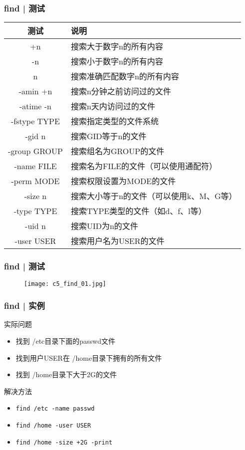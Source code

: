 \begin{frame}
  \frametitle{find | \alert{测试}}
  \begin{table}
    \centering
    \begin{tabularx}{0.9\textwidth}{cX}
      \hline
      \rowcolor{blue!50}测试 & 说明\\
      \hline
      +n & 搜索大于数字n的所有内容\\
      -n & 搜索小于数字n的所有内容\\
      n & 搜索准确匹配数字n的所有内容\\
      -amin +n & 搜索n分钟之前访问过的文件\\
      -atime -n & 搜索n天内访问过的文件\\
      -fstype TYPE & 搜索指定类型的文件系统\\
      -gid n & 搜索GID等于n的文件\\
      -group GROUP & 搜索组名为GROUP的文件\\
      -name FILE & 搜索名为FILE的文件（可以使用通配符）\\
      -perm MODE & 搜索权限设置为MODE的文件\\
      -size n & \small{搜索大小等于n的文件（可以使用k、M、G等）}\\
      -type TYPE & 搜索TYPE类型的文件（如d、f、l等）\\
      -uid n & 搜索UID为n的文件\\
      -user USER & 搜索用户名为USER的文件\\
      \hline
    \end{tabularx}
  \end{table}
\end{frame}

\begin{frame}
  \frametitle{find | 测试}
  \begin{figure}
    \centering
    \texttt{[image: c5\_find\_01.jpg]}
  \end{figure}
\end{frame}

\begin{frame}[fragile]
  \frametitle{find | \alert{实例}}
  \begin{block}{实际问题}
    \begin{itemize}
      \item<2-> 找到 /etc目录下面的passwd文件
      \item<4-> 找到用户USER在 /home目录下拥有的所有文件
      \item<6-> 找到 /home目录下大于2G的文件
    \end{itemize}
  \end{block}
  \begin{block}{解决方法}
    \begin{itemize}
      \item<3-> \verb|find /etc -name passwd|
      \item<5-> \verb|find /home -user USER|
      \item<7-> \verb|find /home -size +2G -print|
    \end{itemize}
  \end{block}
\end{frame}

